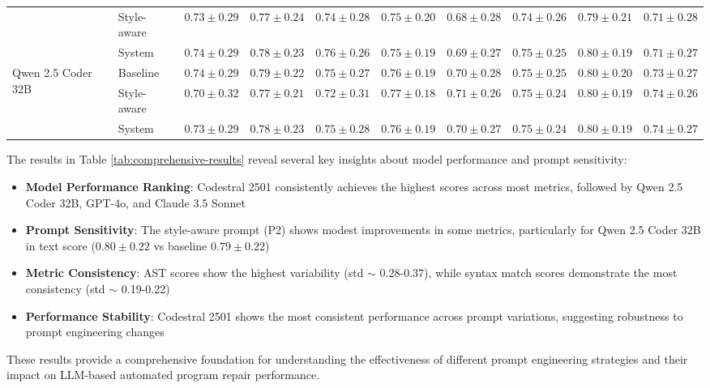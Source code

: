 \begin{table}[h!]
{\begin{tabular}{|l|l|c|c|c|c|c|c|c|c|}
\cline{2-10}
& Style-aware & $0.73 \pm 0.29$ & $0.77 \pm 0.24$ & $0.74 \pm 0.28$ & $0.75 \pm 0.20$ & $0.68 \pm 0.28$ & $0.74 \pm 0.26$ & $0.79 \pm 0.21$ & $0.71 \pm 0.28$ \\
\cline{2-10}
& System & $0.74 \pm 0.29$ & $0.78 \pm 0.23$ & $0.76 \pm 0.26$ & $0.75 \pm 0.19$ & $0.69 \pm 0.27$ & $0.75 \pm 0.25$ & $0.80 \pm 0.19$ & $0.71 \pm 0.27$ \\
\hline
\multirow{3}{*}{Qwen 2.5 Coder 32B} & Baseline & $0.74 \pm 0.29$ & $0.79 \pm 0.22$ & $0.75 \pm 0.27$ & $0.76 \pm 0.19$ & $0.70 \pm 0.28$ & $0.75 \pm 0.25$ & $0.80 \pm 0.20$ & $0.73 \pm 0.27$ \\
\cline{2-10}
& Style-aware & $0.70 \pm 0.32$ & $0.77 \pm 0.21$ & $0.72 \pm 0.31$ & $0.77 \pm 0.18$ & $0.71 \pm 0.26$ & $0.75 \pm 0.24$ & $0.80 \pm 0.19$ & $0.74 \pm 0.26$ \\
\cline{2-10}
& System & $0.73 \pm 0.29$ & $0.78 \pm 0.23$ & $0.75 \pm 0.28$ & $0.76 \pm 0.19$ & $0.70 \pm 0.27$ & $0.75 \pm 0.24$ & $0.80 \pm 0.19$ & $0.74 \pm 0.27$ \\
\hline
\end{tabular}%
}
\end{table}

The results in Table \ref{tab:comprehensive-results} reveal several key insights about model performance and prompt sensitivity:

\begin{itemize}
    \item \textbf{Model Performance Ranking}: Codestral 2501 consistently achieves the highest scores across most metrics, followed by Qwen 2.5 Coder 32B, GPT-4o, and Claude 3.5 Sonnet
    \item \textbf{Prompt Sensitivity}: The style-aware prompt (P2) shows modest improvements in some metrics, particularly for Qwen 2.5 Coder 32B in text score ($0.80 \pm 0.22$ vs baseline $0.79 \pm 0.22$)
    \item \textbf{Metric Consistency}: AST scores show the highest variability (std $\sim$ 0.28-0.37), while syntax match scores demonstrate the most consistency (std $\sim$ 0.19-0.22)
    \item \textbf{Performance Stability}: Codestral 2501 shows the most consistent performance across prompt variations, suggesting robustness to prompt engineering changes
\end{itemize}

These results provide a comprehensive foundation for understanding the effectiveness of different prompt engineering strategies and their impact on LLM-based automated program repair performance.

